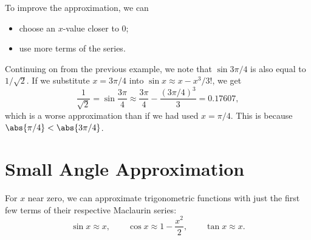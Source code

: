 To improve the approximation, we can 
\begin{itemize}
    \item choose an $x$-value closer to 0;
    \item use more terms of the series.
\end{itemize}

\begin{example}
    Continuing on from the previous example, we note that $\sin{3\pi/4}$ is also equal to $1/\sqrt2$. If we substitute $x = 3\pi/4$ into $\sin x \approx x - x^3/3!$, we get \[\frac1{\sqrt2} = \sin \frac{3\pi}4 \approx \frac{3\pi}4 - \frac{(3\pi/4)^3}{3} = 0.17607,\] which is a worse approximation than if we had used $x = \pi/4$. This is because $\abs{\pi/4} < \abs{3\pi/4}$.
\end{example}

\section{Small Angle Approximation}

For $x$ near zero, we can approximate trigonometric functions with just the first few terms of their respective Maclaurin series: \[\sin x \approx x, \qquad \cos x \approx 1- \frac{x^2}{2}, \qquad \tan x \approx x.\]